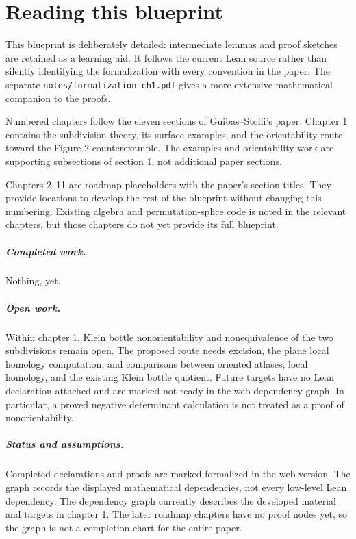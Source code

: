 
\chapter*{Reading this blueprint}

This blueprint is deliberately detailed: intermediate lemmas and proof sketches
are retained as a learning aid. It follows the current Lean source rather than
silently identifying the formalization with every convention in the paper.
The separate \texttt{notes/formalization-ch1.pdf} gives a more extensive
mathematical companion to the proofs.

Numbered chapters follow the eleven sections of Guibas--Stolfi's paper.
Chapter 1 contains the subdivision theory, its surface examples, and the
orientability route toward the Figure 2 counterexample. The examples and
orientability work are supporting subsections of section 1, not additional
paper sections.

Chapters 2--11 are roadmap placeholders with the paper's section titles.
They provide locations to develop the rest of the blueprint without changing
this numbering. Existing algebra and permutation-splice code is noted in the
relevant chapters, but those chapters do not yet provide its full blueprint.

\paragraph{Completed work.}
Nothing, yet.

\paragraph{Open work.}
Within chapter 1, Klein bottle nonorientability and nonequivalence of the two
subdivisions remain open. The proposed route needs excision, the plane local
homology computation, and comparisons between oriented atlases, local homology,
and the existing Klein bottle quotient. Future targets have no Lean declaration
attached and are marked not ready in the web dependency graph. In particular, a
proved negative determinant calculation is not treated as a proof of
nonorientability.

\paragraph{Status and assumptions.}
Completed declarations and proofs are marked formalized in the web version.
The graph records the displayed mathematical dependencies, not every low-level
Lean dependency.
The dependency graph currently describes the developed material and targets
in chapter 1. The later roadmap chapters have no proof nodes yet, so the graph
is not a completion chart for the entire paper.

